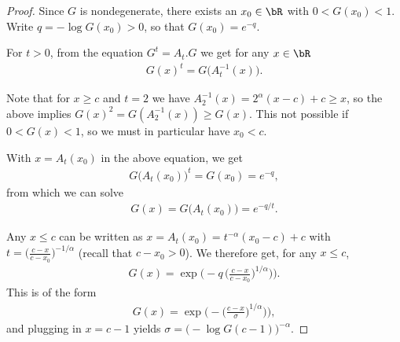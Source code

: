 \begin{proof}

  Since $G$ is nondegenerate, there exists an $x_0 \in \bR$
  with $0 < G(x_0) < 1$. Write $q = -\log G(x_0) > 0$,
  so that $G(x_0) = e^{-q}$.

  For $t > 0$, from the equation $G^{t} = A_t . G$
  we get for any $x \in \bR$
  \begin{align*}
  G(x)^t = G \big( A_t^{-1}(x) \big) . %
  \end{align*}

  Note that for $x \ge c$ and $t = 2$ we have $A_2^{-1}(x) = 2^{\alpha}(x-c) + c \ge x$,
  so the above implies $G(x)^2 = G(A_2^{-1}(x)) \ge G(x)$.
  This not possible if $0 < G(x) < 1$, so we must in particular have $x_0 < c$.

  With $x = A_t(x_0)$ in the above equation, %
  we get
  \begin{align*}
    G\big( A_t(x_0) \big)^{t} = G(x_0) = e^{- q},
  \end{align*}
  from which we can solve
  \begin{align*}
    G(x) = G\big( A_t(x_0) \big) = e^{-q/t} .
  \end{align*}

  Any $x \le c$ can be written as $x = A_t(x_0) = t^{-\alpha} (x_0-c) + c$
  with $t = \big( \frac{c - x}{c - x_0} \big)^{-1/\alpha}$
  (recall that $c - x_0 > 0$).
  We therefore get, for any $x \le c$,
  \begin{align*}
    G(x) = \exp \Big( - q \, \big( \frac{c - x}{c - x_0} \big)^{1/\alpha} \big) \Big) .
  \end{align*}
  This is of the form
  \begin{align*}
    G(x) = \exp \Big( - \big( \frac{c - x}{\sigma} \big)^{1/\alpha} \big) \Big) ,
  \end{align*}
  and plugging in $x = c - 1$ yields $\sigma = \big(- \log G(c-1)\big)^{-\alpha}$.
\end{proof}



